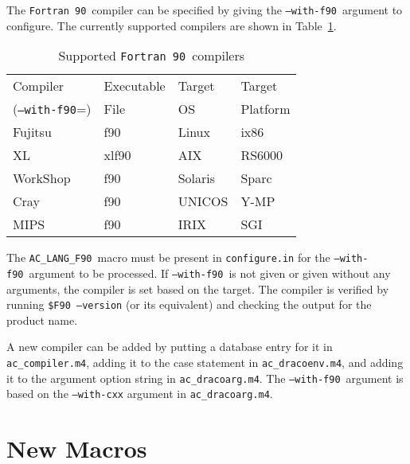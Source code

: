 \documentclass[11pt]{nmemo}
\newcommand{\fninety}{\texttt{Fortran~90}}
\newcommand{\withfninety}{\texttt{--with-f90}}
\newcommand{\langfninety}{\texttt{AC\_LANG\_F90}}
\begin{document}
The \fninety\ compiler can be specified by giving the \withfninety\ 
argument to configure.  The currently supported compilers are shown in
Table~\ref{tbl:compilers}.

\begin{table}[hb]
\hrulefill
\begin{center}
\caption{Supported \fninety\ compilers}\label{tbl:compilers}
\begin{tabular}{l|l|l|l}
Compiler        & Executable & Target  & Target \\
(\withfninety=) & File       & OS      & Platform \\ \hline
Fujitsu         & f90        & Linux   & ix86 \\
XL	        & xlf90      & AIX     & RS6000 \\
WorkShop        & f90	     & Solaris & Sparc \\
Cray            & f90        & UNICOS  & Y-MP \\
MIPS            & f90        & IRIX    & SGI  
\end{tabular}
\end{center}
\hrulefill
\end{table}
The \langfninety\ macro must be present in \texttt{configure.in} for
the \withfninety\ argument to be processed.  If \withfninety\ is not
given or given without any arguments, the compiler is set based on the
target.  The compiler is verified by running \texttt{\$F90 --version}
(or its equivalent) and checking the output for the product name.

A new compiler can be added by putting a database entry for it in
\texttt{ac\_compiler.m4}, adding it to the case statement in
\texttt{ac\_dracoenv.m4}, and adding it to the argument option string
in \texttt{ac\_dracoarg.m4}.  The \withfninety\ argument is based on
the \texttt{--with-cxx} argument in \texttt{ac\_dracoarg.m4}.

\section{New Macros}
\end{document}
